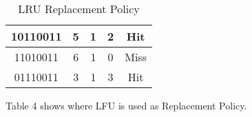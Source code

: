 \documentclass[12pt]{article}
\begin{document}
\begin{table}
\begin{tabular}{|c|c|c|c|c|}
\hline
10110011                                                                     & 5                  & 1                                                                         & 2                      & Hit                 \\ 
\hline
11010011                                                                     & 6                  & 1                                                                         & 0                      & Miss                \\
\hline
01110011                                                                     & 3                  & 1                                                                         & 3                      & Hit                 \\
\hline
\end{tabular}
\caption{LRU Replacement Policy}
\end{table}

Table 4 shows where LFU is used as Replacement Policy.
\end{document}
